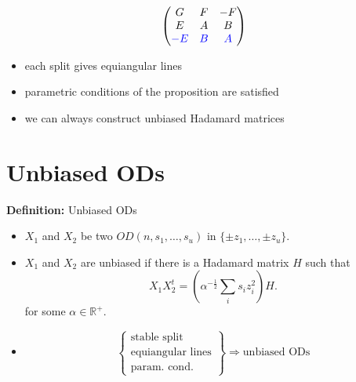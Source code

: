 \documentclass{beamer}
\newcommand{\bblue}[1]{\textcolor{blue}{#1}}
\begin{document}
\begin{frame}

  \[
    \begin{pmatrix}
      G & F & -F \\
      E & A & B \\
      \bblue{-E} & \bblue{B} & \bblue{A}
    \end{pmatrix}
  \]
  
\end{frame}

\begin{frame}

  \begin{itemize}
  \item each split gives equiangular lines
  \item parametric conditions of the proposition are satisfied
  \item we can always construct unbiased Hadamard matrices
  \end{itemize}
  
\end{frame}


\section{Unbiased ODs}

\begin{frame}

  \begin{block}{{\bf Definition:} Unbiased ODs \cite[][]{unbiased-od}}
    \begin{itemize}
    \item $X_1$ and $X_2$ be two $OD(n,s_1, \dots,s_u)$ in $\{\pm z_1, \dots,
      \pm z_u\}$.
    \item $X_1$ and $X_2$ are unbiased if there is a Hadamard matrix $H$ such that
      \[
        X_1X_2^t = \left( \alpha^{-\frac{1}{2}}\sum_i s_iz_i^2 \right)H.
      \]
      for some $\alpha \in \mathbb{R}^+$.
    \end{itemize}
  \end{block}

  \begin{itemize}
  \pause\item
    \[
      \left\{
      \begin{array}{l}
        \text{stable split} \\
        \text{equiangular lines} \\
        \text{param. cond.}
      \end{array} \right\}
      \Rightarrow
      \text{unbiased ODs}
    \]
  \end{itemize}
  
\end{frame}
\end{document}
